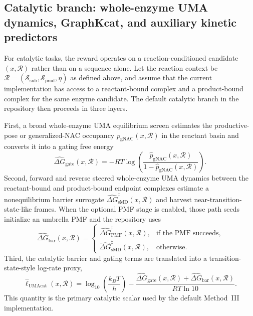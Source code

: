 \documentclass[11pt]{article}
\begin{document}
	\subsection{Catalytic branch: whole-enzyme UMA dynamics, GraphKcat, and auxiliary kinetic predictors}
	
	For catalytic tasks, the reward operates on a reaction-conditioned candidate $(x,\mathcal{R})$ rather than on a sequence alone. Let the reaction context be $\mathcal{R}=(\mathcal{S}_{\mathrm{sub}},\mathcal{S}_{\mathrm{prod}},\eta)$ as defined above, and assume that the current implementation has access to a reactant-bound complex and a product-bound complex for the same enzyme candidate. The default catalytic branch in the repository then proceeds in three layers.
	
	First, a broad whole-enzyme UMA equilibrium screen estimates the productive-pose or generalized-NAC occupancy $p_{\mathrm{gNAC}}(x,\mathcal{R})$ in the reactant basin and converts it into a gating free energy
	\begin{equation}
		\widehat{\Delta G}_{\mathrm{gate}}(x,\mathcal{R})
		=
		-RT\log\!\left(
		\frac{\widehat p_{\mathrm{gNAC}}(x,\mathcal{R})}{1-\widehat p_{\mathrm{gNAC}}(x,\mathcal{R})}
		\right).
	\end{equation}
	Second, forward and reverse steered whole-enzyme UMA dynamics between the reactant-bound and product-bound endpoint complexes estimate a nonequilibrium barrier surrogate $\widehat{\Delta G}_{\mathrm{sMD}}^\ddagger(x,\mathcal{R})$ and harvest near-transition-state-like frames. When the optional PMF stage is enabled, those path seeds initialize an umbrella PMF and the repository uses
	\begin{equation}
		\widehat{\Delta G}_{\mathrm{bar}}(x,\mathcal{R})
		=
		\begin{cases}
			\widehat{\Delta G}_{\mathrm{PMF}}^\ddagger(x,\mathcal{R}), & \text{if the PMF succeeds},\\
			\widehat{\Delta G}_{\mathrm{sMD}}^\ddagger(x,\mathcal{R}), & \text{otherwise.}
		\end{cases}
	\end{equation}
	Third, the catalytic barrier and gating terms are translated into a transition-state-style log-rate proxy,
	\begin{equation}
		\label{eq:ucatproxy}
		\widehat \ell_{\mathrm{UMAcat}}(x,\mathcal{R})
		=
		\log_{10}\!\left(\frac{k_B T}{h}\right)
		-
		\frac{\widehat{\Delta G}_{\mathrm{gate}}(x,\mathcal{R})+\widehat{\Delta G}_{\mathrm{bar}}(x,\mathcal{R})}{RT\ln 10}.
	\end{equation}
	This quantity is the primary catalytic scalar used by the default Method~III implementation.
	
\end{document}
